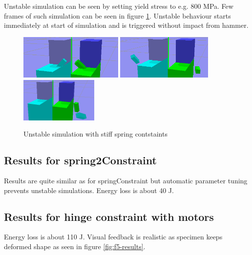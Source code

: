 Unstable simulation can be seen by setting yield stress to e.g. 800 MPa.
Few frames of such simulation can be seen in figure \ref{fig:f3-us-results}.
Unstable behaviour starts immediately at start of simulation and is triggered without impact from hammer.
\begin{figure}[htb!]
\centering
\includegraphics[height=2.2cm]{figs/f2-18-01-us-1}
\includegraphics[height=2.2cm]{figs/f2-18-01-us-2}
\includegraphics[height=2.2cm]{figs/f2-18-01-us-3}
\caption{Unstable simulation with stiff spring contstaints}
\label{fig:f3-us-results}
\end{figure}


\subsection{Results for spring2Constraint}
Results are quite similar as for springConstraint but automatic parameter tuning prevents unstable simulations.
Energy loss is about 40 J.

\subsection{Results for hinge constraint with motors}
Energy loss is about 110 J.
Visual feedback is realistic as specimen keeps deformed shape as seen in figure \ref{fig:f5-results}.

